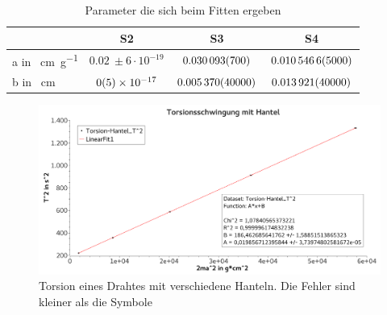 \documentclass[
	a4paper,
	12pt,
	pagesize,
	ngerman
]{scrartcl}
\begin{document}
	\begin{table}[H]
	\centering
	\begin{tabular}{ l |  c | c | c |}
		& S2 & S3 & S4  \\ \hline
		a in \SI{}{\centi\meter\per\gram} &  $ \SI{0,02}{} \pm 6 \cdot 10^{-19}$ & $\SI{0,030093 \pm 0,0007}{}$ & $\SI{0,0105466 \pm 0,0005}{}$  \\ \hline
		b in \SI{}{\centi\meter} &  $\SI{0 \pm 5e-17}{}$ &  $\SI{0,005370 \pm 0,04}{}$&  $\SI{0,013921 \pm 0,04}{}$   \\ \hline
	\end{tabular}
	\caption{Parameter die sich beim Fitten ergeben}
	\label{TabelleFits}
	\end{table}
	\begin{figure}[H]
		\includegraphics[width=1\textwidth]{Torsion}
		\centering
		\caption{Torsion eines Drahtes mit verschiedene Hanteln. Die Fehler sind kleiner als die Symbole}
		\label{TorsionGraph}
		\centering
	\end{figure}
\end{document}
